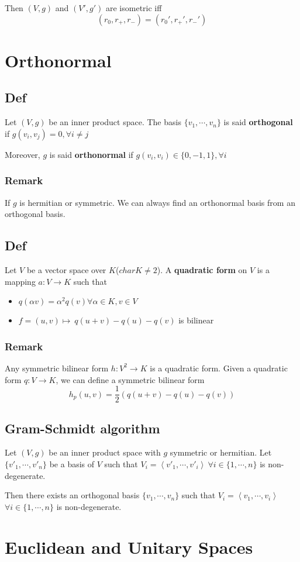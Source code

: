 \documentclass{book}
\begin{document}
Then $(V,g)$ and $(V',g')$ are isometric iff$$(r_0,r_+,r_-)=(r_0',r_+',r_-')$$
\chapter{Orthonormal}
\section{Def}
Let $(V,g)$ be an inner product space. The basis $\{v_1,\cdots, v_n\}$ is said \textbf{orthogonal} if $g(v_i,v_j)=0,\forall i\neq j$

Moreover, $g$ is said \textbf{orthonormal} if $g(v_i,v_i)\in \{0,-1,1\},\forall i$
\subsection*{Remark}
If $g$ is hermitian or symmetric. We can always find an orthonormal basis from an orthogonal basis.
\section{Def}
Let $V$ be a vector space over $K$($char K\neq 2$). A \textbf{quadratic form} on $V$ is a mapping $a:V\rightarrow K$ such that
\begin{itemize}
    \item $q(\alpha v)=\alpha^2q(v)\forall \alpha\in K,v\in V$
    \item $f=(u,v)\mapsto\ q(u+v)-q(u)-q(v)$ is bilinear
\end{itemize}
\subsection*{Remark}
Any symmetric bilinear form $h:V^2\rightarrow K$ is a quadratic form. Given a quadratic form $q:V\rightarrow K$, we can define a symmetric bilinear form$$h_p(u,v)=\frac{1}{2}\left(q(u+v)-q(u)-q(v)\right)$$
\section{Gram-Schmidt algorithm}
Let $(V,g)$ be an inner product space with $g$ symmetric or hermitian. Let $\{v'_1,\cdots,v'_n\}$ be a basis of $V$ such that $V_i=\left<v'_1,\cdots,v'_i\right>\ \forall i\in \{1,\cdots,n\}$ is non-degenerate.

Then there exists an orthogonal basis $\{v_1,\cdots,v_n\}$ such that $V_i=\left<v_1,\cdots,v_i\right>$ $\forall i\in \{1,\cdots,n\}$ is non-degenerate.
\chapter{Euclidean and Unitary Spaces}
\newcommand{\inprod}[2]{\left<#1,#2\right>}
\end{document}
